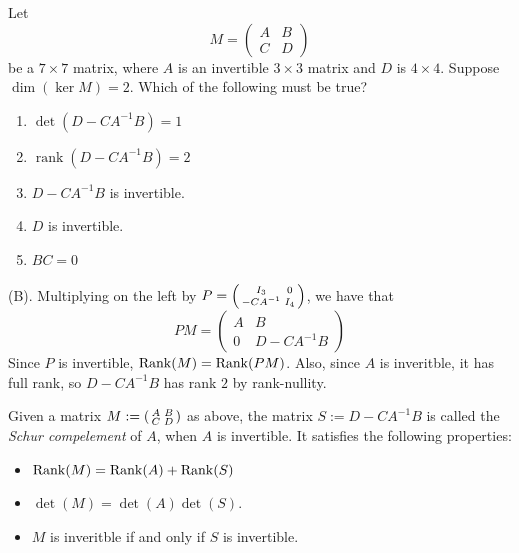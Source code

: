 \begin{exercise}
Let
\[
M=\begin{pmatrix} A & B\\ C & D \end{pmatrix}
\]
be a $7\times7$ matrix, where $A$ is an invertible $3\times3$ matrix and $D$ is $4\times4$. Suppose $\dim(\ker M)=2$. Which of the following must be true?
\begin{enumerate}[label=(\Alph*)]
    \item $\det(D-CA^{-1}B)=1$
    \item $\operatorname{rank}(D-CA^{-1}B)=2$
    \item $D-CA^{-1}B$ is invertible.
    \item $D$ is invertible.
    \item $BC=0$
\end{enumerate}
\end{exercise}
\begin{solution}
(B). Multiplying on the left by $P = \begin{psmallmatrix}
I_3 & 0 \\
-CA^{-1} & I_4
\end{psmallmatrix}$, we have that 
\[
PM = \begin{pmatrix}
    A & B \\
    0 & D - CA^{-1}B
\end{pmatrix}
\]
Since $P$ is invertible, $\mathrm{Rank}(M) = \mathrm{Rank}(PM)$. Also, since $A$ is inveritble, it has full rank, so 
$D - CA^{-1}B$ has rank $2$ by rank-nullity.
\end{solution}

\begin{remark}
Given a matrix $M := \begin{psmallmatrix}
A & B \\ C & D
\end{psmallmatrix}$ as above, the matrix $S := D - CA^{-1}B$ is called the \emph{Schur compelement} of $A$,
when $A$ is invertible. It satisfies the following properties:
\begin{itemize}
    \item $\mathrm{Rank}(M) = \mathrm{Rank}(A) + \mathrm{Rank}(S)$
    \item $\det(M) = \det(A) \det(S)$.
    \item $M$ is inveritble if and only if $S$ is invertible.
\end{itemize}
\end{remark}

